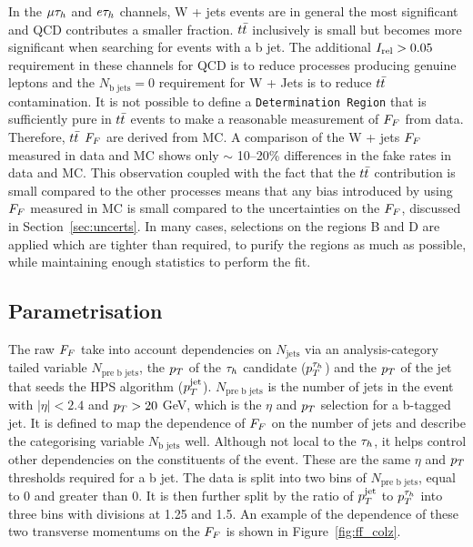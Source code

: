 In the $\mu\tau_{h}$ and $e\tau_{h}$ channels, W + jets \jtth events are in general the most significant and \ac{QCD} contributes a smaller fraction. 
$t\bar{t}$ inclusively is small but becomes more significant when searching for events with a b jet. 
The additional $I_{\text{rel}}>0.05$ requirement in these channels for \ac{QCD} is to reduce processes producing genuine leptons and the $N_{\text{b jets}}=0$ requirement for W + Jets is to reduce $t\bar{t}$ contamination.
It is not possible to define a \texttt{Determination Region} that is sufficiently pure in $t\bar{t}$ events to make a reasonable measurement of $F_{F}$ from data.
Therefore, $t\bar{t}$ $F_{F}$ are derived from \ac{MC}. 
A comparison of the W + jets $F_{F}$ measured in data and \ac{MC} shows only $\sim$ 10--20\% differences in the fake rates in data and \ac{MC}.  
This observation coupled with the fact that the $t\bar{t}$ contribution is small compared to the other processes means that any bias introduced by using $F_{F}$ measured in \ac{MC} is small compared to the uncertainties on the $F_{F}$, discussed in Section~\ref{sec:uncerts}. 
In many cases, selections on the regions B and D are applied which are tighter than required, to purify the regions as much as possible, while maintaining enough statistics to perform the fit.\\


\subsection{Parametrisation}
\label{sec:ff_params}

The raw $F_{F}$ take into account dependencies on $N_{\text{jets}}$ via an analysis-category tailed variable $N_{\text{pre b jets}}$, the $p_{T}$ of the $\tau_{h}$ candidate ($p_{T}^{\tau_{h}}$) and the $p_{T}$ of the jet that seeds the \ac{HPS} algorithm ($p_{T}^{\text{jet}}$).
$N_{\text{pre b jets}}$ is the number of jets in the event with $|\eta|<2.4$ and $p_{T}>20$ GeV, which is the $\eta$ and $p_{T}$ selection for a b-tagged jet. 
It is defined to map the dependence of $F_{F}$ on the number of jets and describe the categorising variable $N_{\text{b jets}}$ well.
Although not local to the $\tau_{h}$, it helps control other dependencies on the constituents of the event.
These are the same $\eta$ and $p_{T}$ thresholds required for a b jet.
The data is split into two bins of $N_{\text{pre b jets}}$, equal to 0 and greater than 0.
It is then further split by the ratio of $p_{T}^{\text{jet}}$ to $p_{T}^{\tau_{h}}$ into three bins with divisions at 1.25 and 1.5.
An example of the dependence of these two transverse momentums on the $F_{F}$ is shown in Figure~\ref{fig:ff_colz}. \\

